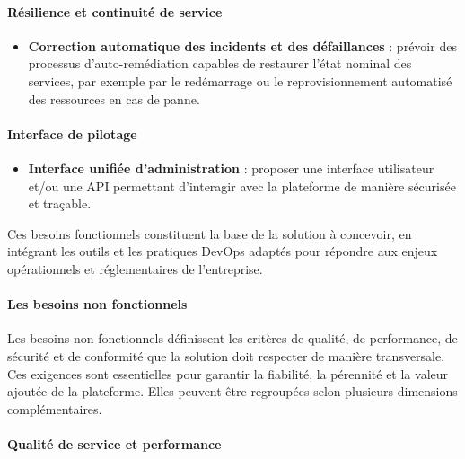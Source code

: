 \paragraph{\textbf{Résilience et continuité de service}}

\begin{itemize}
	\item \textbf{Correction automatique des incidents et des défaillances} : prévoir des processus d'auto-remédiation capables de restaurer l'état nominal des services, par exemple par le redémarrage ou le reprovisionnement automatisé des ressources en cas de panne.
\end{itemize}

\paragraph{\textbf{Interface de pilotage}}

\begin{itemize}
	\item \textbf{Interface unifiée d'administration} : proposer une interface utilisateur et/ou une API permettant d'interagir avec la plateforme de manière sécurisée et traçable.
\end{itemize}

Ces besoins fonctionnels constituent la base de la solution à concevoir, en intégrant les outils et les pratiques DevOps adaptés pour répondre aux enjeux opérationnels et réglementaires de l'entreprise.

\paragraph{\textbf{Les besoins non fonctionnels}}

Les besoins non fonctionnels définissent les critères de qualité, de performance, de sécurité et de conformité que la solution doit respecter de manière transversale. Ces exigences sont essentielles pour garantir la fiabilité, la pérennité et la valeur ajoutée de la plateforme. Elles peuvent être regroupées selon plusieurs dimensions complémentaires.

\paragraph{\textbf{Qualité de service et performance}}

